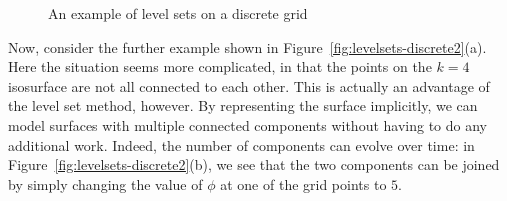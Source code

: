 \begin{figure}[H]
\begin{center}
	\hspace{4mm}%
\end{center}
\caption{An example of level sets on a discrete grid}
\label{fig:levelsets-discrete1}
\end{figure}

Now, consider the further example shown in Figure~\ref{fig:levelsets-discrete2}(a). Here the situation seems more complicated, in that the points on the $k = 4$ isosurface are not all connected to each other. This is actually an advantage of the level set method, however. By representing the surface implicitly, we can model surfaces with multiple connected components without having to do any additional work. Indeed, the number of components can evolve over time: in Figure~\ref{fig:levelsets-discrete2}(b), we see that the two components can be joined by simply changing the value of $\phi$ at one of the grid points to $5$.

